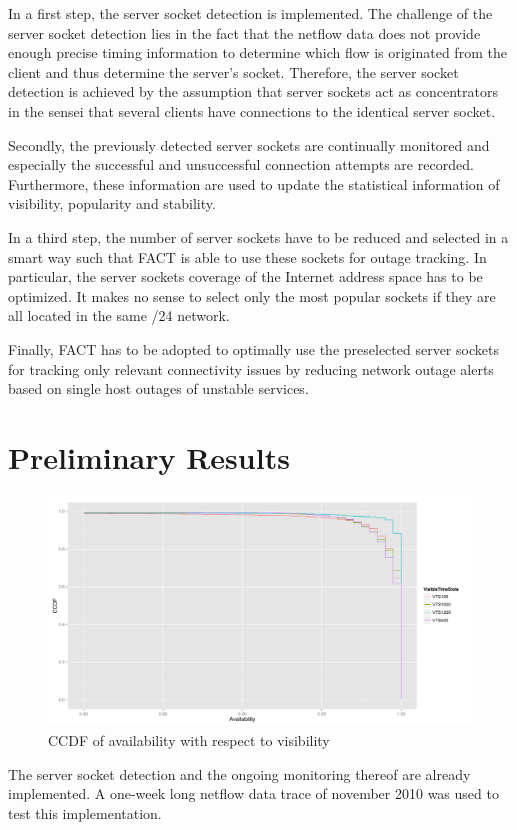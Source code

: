 \documentclass{sigcomm-alternate}
\begin{document}
In a first step, the server socket detection is implemented. The
challenge of the server socket detection lies in the fact that the
netflow data does not provide enough precise timing information to
determine which flow is originated from the client and thus determine
the server's socket. Therefore, the server socket detection is achieved
by the assumption that server sockets act as concentrators in the sensei
that several clients have connections to the identical server socket.

Secondly, the previously detected server sockets are continually
monitored and especially the successful and unsuccessful connection
attempts are recorded. Furthermore, these information are used to update
the statistical information of visibility, popularity and stability.

In a third step, the number of server sockets have to be reduced and
selected in a smart way such that FACT is able to use these sockets
for outage tracking. In particular, the server sockets coverage of the
Internet address space has to be optimized. It makes no sense to select
only the most popular sockets if they are all located in the same /24
network.

Finally, FACT has to be adopted to optimally use the preselected server
sockets for tracking only relevant connectivity issues by reducing
network outage alerts based on single host outages of unstable services.


\section{Preliminary Results}
\begin{figure}[ht!]
\centering
\includegraphics[width=18cm]{images/RATIO_VTS_External.pdf}
\caption{CCDF of availability with respect to visibility}
\label{fig:RatioVTS}
\end{figure}
The server socket detection and the ongoing monitoring thereof are already implemented. A one-week long netflow data trace of november 2010 was used to test this implementation. 
\end{document}

